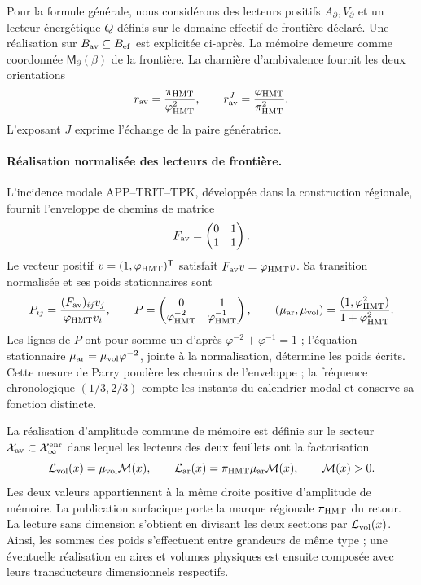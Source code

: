 Pour la formule générale, nous considérons des lecteurs positifs
\(A_\partial,V_\partial\) et un lecteur énergétique \(Q\)
définis sur le domaine effectif de frontière déclaré.
Une réalisation sur
\(B_{\rm av}\subseteq B_{\rm ef}\) est explicitée ci-après. La mémoire demeure comme coordonnée
\(\mathsf M_\partial(\beta)\) de la frontière. La charnière
d'ambivalence fournit les deux orientations
\[
 r_{\rm av}=\frac{\pi_{\rm HMT}}{\varphi_{\rm HMT}^2},\qquad
 r_{\rm av}^{J}=\frac{\varphi_{\rm HMT}}{\pi_{\rm HMT}^2}.
\]
L'exposant \(J\) exprime l'échange de la paire génératrice.
\paragraph{Réalisation normalisée des lecteurs de frontière.}
L'incidence modale APP--TRIT--TPK, développée dans la construction régionale, fournit l'enveloppe de chemins de matrice
\[
 F_{\rm av}=\begin{pmatrix}0&1\\1&1\end{pmatrix}.
\]
Le vecteur positif \(v=(1,\varphi_{\rm HMT})^{\mathsf T}\) satisfait \(F_{\rm av}v=\varphi_{\rm HMT}v\). Sa transition normalisée et ses poids stationnaires sont
\begin{equation}
 P_{ij}=\frac{(F_{\rm av})_{ij}v_j}{\varphi_{\rm HMT}v_i},
 \qquad
 P=\begin{pmatrix}0&1\\
 \varphi_{\rm HMT}^{-2}&\varphi_{\rm HMT}^{-1}\end{pmatrix},
 \qquad
 (\mu_{\rm ar},\mu_{\rm vol})
 =\frac{(1,\varphi_{\rm HMT}^{2})}{1+\varphi_{\rm HMT}^{2}}.
 \label{vii:vii:eq:lectores-parry}
\end{equation}
Les lignes de \(P\) ont pour somme un d'après
\(\varphi^{-2}+\varphi^{-1}=1\) ; l'équation stationnaire
\(\mu_{\rm ar}=\mu_{\rm vol}\varphi^{-2}\), jointe à la
normalisation, détermine les poids écrits. Cette mesure de Parry
pondère les chemins de l'enveloppe ; la fréquence chronologique
\((1/3,2/3)\) compte les instants du calendrier modal et conserve
sa fonction distincte.

La réalisation d'amplitude commune de mémoire est définie sur le secteur
\(\mathcal X_{\rm av}\subset\mathcal X_\infty^{\rm enr}\) dans lequel
les lecteurs des deux feuillets ont la factorisation
\begin{equation}
 \mathcal L_{\rm vol}(x)=\mu_{\rm vol}\mathcal M(x),\qquad
 \mathcal L_{\rm ar}(x)=\pi_{\rm HMT}\mu_{\rm ar}\mathcal M(x),
 \qquad \mathcal M(x)>0.
 \label{vii:vii:eq:lectores-amplitud-comun}
\end{equation}
Les deux valeurs appartiennent à la même droite positive d'amplitude de mémoire. La publication surfacique porte la marque régionale \(\pi_{\rm HMT}\) du retour. La lecture sans dimension s'obtient en divisant les deux sections par \(\mathcal L_{\rm vol}(x)\). Ainsi, les sommes des poids s'effectuent entre grandeurs de même type ; une éventuelle réalisation en aires et volumes physiques est ensuite composée avec leurs transducteurs dimensionnels respectifs.

